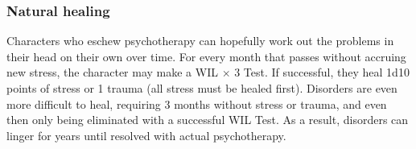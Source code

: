 \subsubsection{Natural healing} 

Characters who eschew psychotherapy can hopefully work out the problems in their head on their own over time. For every month that passes without accruing new stress, the character may make a WIL $\times$ 3 Test. If successful, they heal 1d10 points of stress or 1 trauma (all stress must be healed first). Disorders are even more difficult to heal, requiring 3 months without stress or trauma, and even then only being eliminated with a successful WIL Test. As a result, disorders can linger for years until resolved with actual psychotherapy. 



